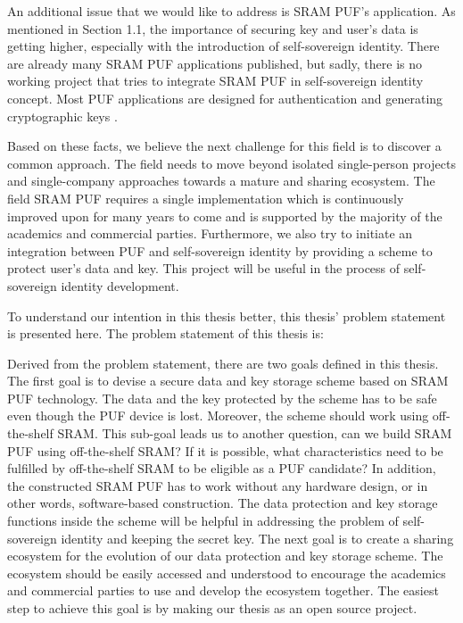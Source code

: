 An additional issue that we would like to address is SRAM PUF's application. As mentioned in Section 1.1, the importance of securing key and user's data is getting higher, especially with the introduction of self-sovereign identity. There are already many SRAM PUF applications published, but sadly, there is no working project that tries to integrate SRAM PUF in self-sovereign identity concept. Most PUF applications are designed for authentication \cite{Tuyls2007} \cite{delvaux} \cite{Suh:2007:PUF:1278480.1278484} \cite{10.1007/978-3-642-04474-8_22} \cite{10.1007/978-3-642-10838-9_22} \cite{10.1007/978-3-319-29078-2_5}
and generating cryptographic keys \cite{Suh:2007:PUF:1278480.1278484} \cite{10.1007/978-3-642-33027-8_18}.

Based on these facts, we believe the next challenge for this field is to discover a common approach. The field needs to move beyond isolated single-person projects and single-company approaches towards a mature and sharing ecosystem. The field SRAM PUF requires a single implementation which is continuously improved upon for many years to come and is supported by the majority of the academics and commercial parties.
Furthermore, we also try to initiate an integration between PUF and self-sovereign identity by providing a scheme to protect user's data and key. This project will be useful in the process of self-sovereign identity development.

To understand our intention in this thesis better, this thesis' problem statement is presented here. The problem statement of this thesis is:

\begin{adjustwidth}{1cm}{1cm}
		\textit{\problemStatement}
\end{adjustwidth}

Derived from the problem statement, there are two goals defined in this thesis. The first goal is to devise a secure data and key storage scheme based on SRAM PUF technology. The data and the key protected by the scheme has to be safe even though the PUF device is lost. Moreover, the scheme should work using off-the-shelf SRAM. This sub-goal leads us to another question, can we build SRAM PUF using off-the-shelf SRAM? If it is possible, what characteristics need to be fulfilled by off-the-shelf SRAM to be eligible as a PUF candidate?
In addition, the constructed SRAM PUF has to work without any hardware design, or in other words, software-based construction. The data protection and key storage functions inside the scheme will be helpful in addressing the problem of self-sovereign identity and keeping the secret key.
The next goal is to create a sharing ecosystem for the evolution of our data protection and key storage scheme. The ecosystem should be easily accessed and understood to encourage the academics and commercial parties to use and develop the ecosystem together. The easiest step to achieve this goal is by making our thesis as an open source project.
